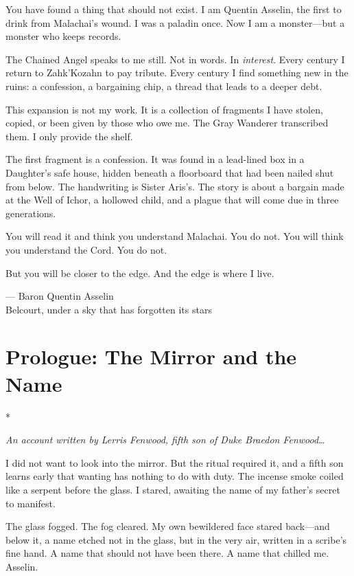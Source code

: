 \documentclass[11pt]{article}
\newenvironment{founddocument}{%
  \begin{mdframed}[backgroundcolor=horrorbg, linecolor=bloodcolor, linewidth=1pt, leftmargin=0.5cm, rightmargin=0.5cm]
  \setlength{\parskip}{0.8em}
}{%
  \end{mdframed}
}
\begin{document}
\begin{founddocument}
\noindent
You have found a thing that should not exist. I am Quentin Asselin, the first to drink from Malachai's wound. I was a paladin once. Now I am a monster---but a monster who keeps records.

The Chained Angel speaks to me still. Not in words. In \emph{interest}. Every century I return to Zahk'Kozahn to pay tribute. Every century I find something new in the ruins: a confession, a bargaining chip, a thread that leads to a deeper debt.

This expansion is not my work. It is a collection of fragments I have stolen, copied, or been given by those who owe me. The Gray Wanderer transcribed them. I only provide the shelf.

The first fragment is a confession. It was found in a lead-lined box in a Daughter's safe house, hidden beneath a floorboard that had been nailed shut from below. The handwriting is Sister Aris's. The story is about a bargain made at the Well of Ichor, a hollowed child, and a plague that will come due in three generations.

You will read it and think you understand Malachai. You do not. You will think you understand the Cord. You do not.

But you will be closer to the edge. And the edge is where I live.

\vspace{1em}
\noindent
--- Baron Quentin Asselin\\
Belcourt, under a sky that has forgotten its stars
\end{founddocument}

\newpage


\section{Prologue: The Mirror and the Name}*

\textit{An account written by Lerris Fenwood, fifth son of Duke Braedon Fenwood\dots}

\vspace{1em}

I did not want to look into the mirror. But the ritual required it, and a fifth son learns early that wanting has nothing to do with duty. The incense smoke coiled like a serpent before the glass. I stared, awaiting the name of my father's secret to manifest.

The glass fogged. The fog cleared. My own bewildered face stared back---and below it, a name etched not in the glass, but in the very air, written in a scribe's fine hand. A name that should not have been there. A name that chilled me. Asselin.
\end{document}
